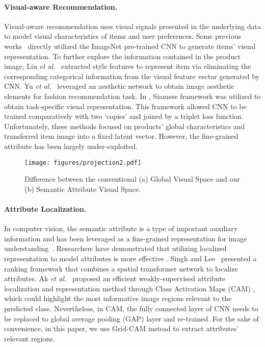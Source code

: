 \documentclass{article}
\begin{document}
\paragraph{Visual-aware Recommendation.} Visual-aware recommendation uses visual signals presented in the underlying data to model visual characteristics of items and user preferences. Some previous works~\cite{mcauley2015image,he2016vbpr,he2016ups,he2016sherlock,HASC2019} directly utilized the ImageNet pre-trained CNN to generate items' visual representation. To further explore the information contained in the product image, Liu \textit{et al.}~ extracted style features to represent item via eliminating the corresponding categorical information from the visual feature vector generated by CNN.  Yu \textit{et al.}~ leveraged an aesthetic network to obtain image aesthetic elements for fashion recommendation task.  In \cite{kang2017visually,lei2016comparative}, Siamese framework was utilized to obtain task-specific visual representation. This framework allowed CNN to be trained comparatively with two `copies' and joined by a triplet loss function. Unfortunately, these methods focused on products' global characteristics and transferred item image into a fixed latent vector. However, the fine-grained attribute has been largely under-exploited.
\begin{figure}
    \centering
    \texttt{[image: figures/projection2.pdf]}\caption{Difference between the conventional (a) Global Visual Space and our (b) Semantic Attribute Visual Space.}
    \centering
    \bigskip
    \label{fig:projection}
\end{figure}
\paragraph{Attribute Localization.} In computer vision, the semantic attribute is a type of important auxiliary information and has been leveraged as a fine-grained representation for image understanding~\cite{10.1007/978-3-642-33712-3_44,kovashka2012whittlesearch}. Researchers have demonstrated that utilizing localized representation to model attributes is more effective \cite{xiao2015discovering}.  Singh and Lee~ presented a ranking framework that combines a spatial transformer network to localize attributes. Ak \textit{et al.}~ proposed an efficient weakly-supervised attribute localization and representation method through Class Activation Maps (CAM) \cite{zhou2016learning}, which could highlight the most informative image regions relevant to the predicted class. Nevertheless, in CAM, the fully connected layer of CNN needs to be replaced to global average pooling (GAP) layer and re-trained. For the sake of convenience, in this paper, we use Grid-CAM \cite{selvaraju2017grad} instead to extract attributes' relevant regions.
\end{document}
